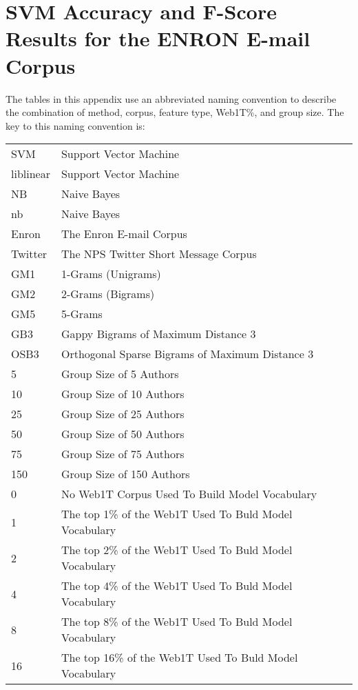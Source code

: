 \chapter{SVM Accuracy and F-Score Results for the ENRON E-mail Corpus}


The tables in this appendix use an abbreviated naming convention to describe the combination of method, corpus, feature type, Web1T\%, and group size.  The key to this naming convention is:

\begin{center}
\begin{table}[htbp!]
	\begin{center}
	\begin{tabular}{ll}
	SVM & Support Vector Machine\\
	liblinear & Support Vector Machine\\
	NB & Naive Bayes\\
	nb & Naive Bayes\\
	
	Enron & The Enron E-mail Corpus\\
	Twitter & The NPS Twitter Short Message Corpus\\
	
	GM1 & 1-Grams (Unigrams)\\
	GM2 & 2-Grams (Bigrams)\\
	GM5 & 5-Grams\\
	GB3 & Gappy Bigrams of Maximum Distance 3\\
	OSB3 & Orthogonal Sparse Bigrams of Maximum Distance 3\\
		
	5 & Group Size of 5 Authors\\
	10 & Group Size of 10 Authors\\
	25 & Group Size of 25 Authors\\
	50 & Group Size of 50 Authors\\
	75 & Group Size of 75 Authors\\
	150 & Group Size of 150 Authors\\
	
	0 & No Web1T Corpus Used To Build Model Vocabulary\\
	1 & The top 1\% of the Web1T Used To Buld Model Vocabulary\\
	2 & The top 2\% of the Web1T Used To Buld Model Vocabulary\\
	4 & The top 4\% of the Web1T Used To Buld Model Vocabulary\\
	8 & The top 8\% of the Web1T Used To Buld Model Vocabulary\\
	16 & The top 16\% of the Web1T Used To Buld Model Vocabulary\\
	\end{tabular}
	\end{center}
\end{table}
\end{center}



